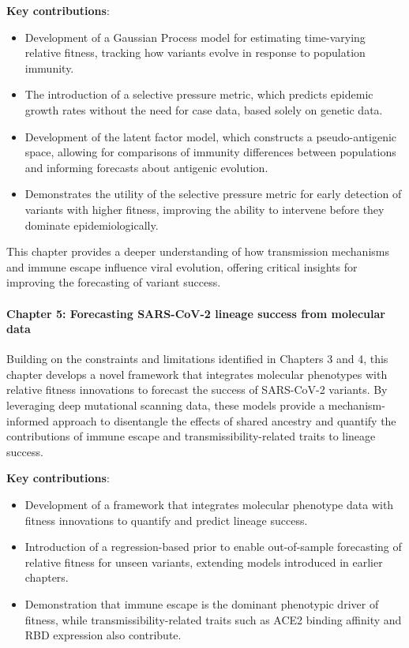 \noindent\textbf{Key contributions}:
\begin{itemize}
  \item Development of a Gaussian Process model for estimating time-varying relative fitness, tracking how variants evolve in response to population immunity.
  \item The introduction of a selective pressure metric, which predicts epidemic growth rates without the need for case data, based solely on genetic data.
  \item Development of the latent factor model, which constructs a pseudo-antigenic space, allowing for comparisons of immunity differences between populations and informing forecasts about antigenic evolution.
  \item Demonstrates the utility of the selective pressure metric for early detection of variants with higher fitness, improving the ability to intervene before they dominate epidemiologically.
\end{itemize}

This chapter provides a deeper understanding of how transmission mechanisms and immune escape influence viral evolution, offering critical insights for improving the forecasting of variant success.

\paragraph{Chapter 5: Forecasting SARS-CoV-2 lineage success from molecular data}

Building on the constraints and limitations identified in Chapters 3 and 4, this chapter develops a novel framework that integrates molecular phenotypes with relative fitness innovations to forecast the success of SARS-CoV-2 variants. By leveraging deep mutational scanning data, these models provide a mechanism-informed approach to disentangle the effects of shared ancestry and quantify the contributions of immune escape and transmissibility-related traits to lineage success.

\noindent\textbf{Key contributions}:
\begin{itemize}
  \item Development of a framework that integrates molecular phenotype data with fitness innovations to quantify and predict lineage success.
  \item Introduction of a regression-based prior to enable out-of-sample forecasting of relative fitness for unseen variants, extending models introduced in earlier chapters.
  \item Demonstration that immune escape is the dominant phenotypic driver of fitness, while transmissibility-related traits such as ACE2 binding affinity and RBD expression also contribute.
\end{itemize}

